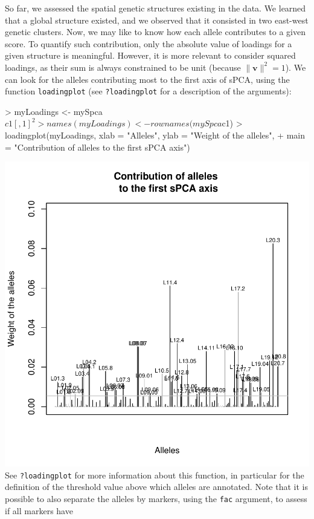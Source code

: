 \documentclass{article}
\newcommand{\m}[1]{\mathbf{#1}}
\begin{document}
So far, we assessed the spatial genetic structures existing in the data.
We learned that a global structure existed, and we observed that it
consisted in two east-west genetic clusters.
Now, we may like to know how each allele contributes to a given score.
To quantify such contribution, only the absolute value of loadings for
a given structure is meaningful.
However, it is more relevant to consider squared loadings, as their
sum is always constrained to be unit (because $\|\m{v}\|^2=1$).
We can look for the alleles contributing most to the first axis
of sPCA, using the function \texttt{loadingplot} (see \texttt{?loadingplot} for
a description of the arguments):
\begin{Schunk}
\begin{Sinput}
> myLoadings <- mySpca$c1[, 1]^2
> names(myLoadings) <- rownames(mySpca$c1)
> loadingplot(myLoadings, xlab = "Alleles", ylab = "Weight of the alleles", 
+     main = "Contribution of alleles \n to the first sPCA axis")
\end{Sinput}
\end{Schunk}
\includegraphics{figs/spca-019}
\noindent See \texttt{?loadingplot} for more information about this
function, in particular for the definition of the threshold value
above which alleles are annotated.
Note that it is possible to also separate the alleles by markers,
using the \texttt{fac} argument, to assess if all markers have
\end{document}
